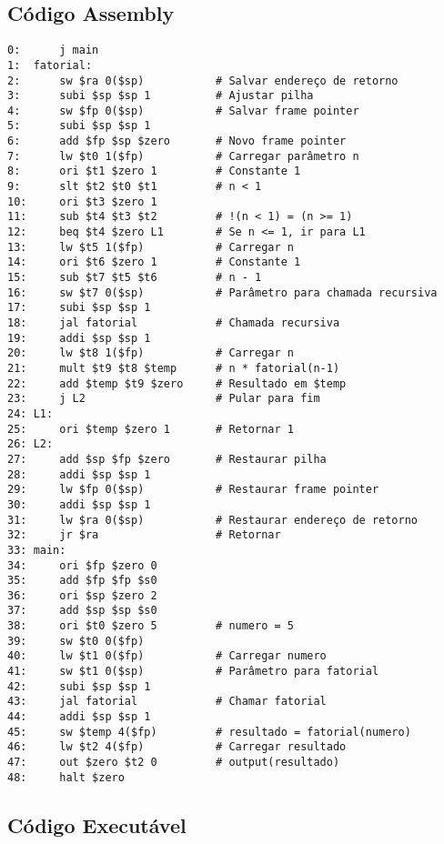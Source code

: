 \documentclass[
	12pt,				%
	oneside,
	a4paper,			%
	english,			%
	french,				%
	spanish,			%
	brazil,				%
	]{abntex2}
\begin{document}
\subsection{Código Assembly}

\begin{lstlisting}[style=assemblystyle, caption=Exemplo 2: Código assembly MIPS]
0:      j main
1:  fatorial:
2:      sw $ra 0($sp)           # Salvar endereço de retorno
3:      subi $sp $sp 1          # Ajustar pilha
4:      sw $fp 0($sp)           # Salvar frame pointer
5:      subi $sp $sp 1
6:      add $fp $sp $zero       # Novo frame pointer
7:      lw $t0 1($fp)           # Carregar parâmetro n
8:      ori $t1 $zero 1         # Constante 1
9:      slt $t2 $t0 $t1         # n < 1
10:     ori $t3 $zero 1
11:     sub $t4 $t3 $t2         # !(n < 1) = (n >= 1)
12:     beq $t4 $zero L1        # Se n <= 1, ir para L1
13:     lw $t5 1($fp)           # Carregar n
14:     ori $t6 $zero 1         # Constante 1
15:     sub $t7 $t5 $t6         # n - 1
16:     sw $t7 0($sp)           # Parâmetro para chamada recursiva
17:     subi $sp $sp 1
18:     jal fatorial            # Chamada recursiva
19:     addi $sp $sp 1
20:     lw $t8 1($fp)           # Carregar n
21:     mult $t9 $t8 $temp      # n * fatorial(n-1)
22:     add $temp $t9 $zero     # Resultado em $temp
23:     j L2                    # Pular para fim
24: L1:
25:     ori $temp $zero 1       # Retornar 1
26: L2:
27:     add $sp $fp $zero       # Restaurar pilha
28:     addi $sp $sp 1
29:     lw $fp 0($sp)           # Restaurar frame pointer
30:     addi $sp $sp 1
31:     lw $ra 0($sp)           # Restaurar endereço de retorno
32:     jr $ra                  # Retornar
33: main:
34:     ori $fp $zero 0
35:     add $fp $fp $s0
36:     ori $sp $zero 2
37:     add $sp $sp $s0
38:     ori $t0 $zero 5         # numero = 5
39:     sw $t0 0($fp)
40:     lw $t1 0($fp)           # Carregar numero
41:     sw $t1 0($sp)           # Parâmetro para fatorial
42:     subi $sp $sp 1
43:     jal fatorial            # Chamar fatorial
44:     addi $sp $sp 1
45:     sw $temp 4($fp)         # resultado = fatorial(numero)
46:     lw $t2 4($fp)           # Carregar resultado
47:     out $zero $t2 0         # output(resultado)
48:     halt $zero
\end{lstlisting}

\subsection{Código Executável}
\end{document}
